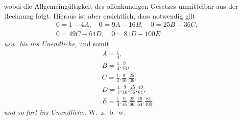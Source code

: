 wobei die Allgemeingültigkeit des offenkundigen Gesetzes unmittelbar aus der Rechnung folgt. Hieraus ist aber ersichtlich,
dass notwendig gilt
\[
\begin{gathered}0=1-4A,\quad 0=9A-16B,\quad 0=25B-36C,\\[6pt]
0=49C-64D,\quad 0=81D-100E\end{gathered}
\]
\textit{usw. bis ins Unendliche,} und somit
\[
\begin{gathered}A=\tfrac14,\\ B=\tfrac14.\tfrac9{16},\\[6pt]
C=\tfrac14.\tfrac9{16}.\tfrac{25}{36},\\[6pt]
D=\tfrac14.\tfrac9{16}.\tfrac{25}{36}.\tfrac{49}{64},\\[6pt]
E=\tfrac14.\tfrac9{16}.\tfrac{25}{36}.\tfrac{49}{64}.\tfrac{81}{100}\end{gathered}
\]
\textit{und so fort ins Unendliche.} W.~z.~b.~w.
\clearpage
\endgroup
